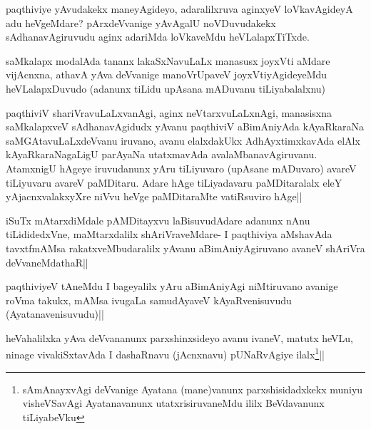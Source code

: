 \stext 


\begin{artha}
paqthiviye yAvudakekx maneyAgideyo, adaralilxruva aginxyeV loVkavAgideyA adu heVgeMdare? pArxdeVvanige yAvAgalU noVDuvudakekx sAdhanavAgiruvudu aginx adariMda loVkaveMdu heVLalapxTiTxde.
\end{artha}


\begin{artha}
saMkalapx modalAda tananx lakaSxNavuLaLx manasusx joyxVti aMdare vijAcnxna, athavA yAva deVvanige manoVrUpaveV joyxVtiyAgideyeMdu heVLalapxDuvudo (adanunx tiLidu upAsana mADuvanu tiLiyabalalxnu)
\end{artha}


\begin{artha}
paqthiviV shariVravuLaLxvanAgi, aginx neVtarxvuLaLxnAgi, manasisxna saMkalapxveV sAdhanavAgidudx yAvanu paqthiviV aBimAniyAda kAyaRkaraNa saMGAtavuLaLxdeVvanu iruvano, avanu elalxdakUkx AdhAyxtimxkavAda elAlx kAyaRkaraNagaLigU parAyaNa utatxmavAda avalaMbanavAgiruvanu. AtamxnigU hAgeye iruvudanunx yAru tiLiyuvaro (upAsane mADuvaro) avareV tiLiyuvaru avareV paMDitaru. Adare hAge tiLiyadavaru paMDitaralalx eleY yAjacnxvalakxyXre niVvu heVge paMDitaraMte vatiRsuviro hAge||
\end{artha}


\begin{artha}
iSuTx mAtarxdiMdale pAMDitayxvu laBisuvudAdare adanunx nAnu tiLididedxVne, maMtarxdalilx shAriVraveMdare- I paqthiviya aMshavAda tavxtfmAMsa rakatxveMbudaralilx yAvanu aBimAniyAgiruvano avaneV shAriVra deVvaneMdathaR||
\end{artha}


\begin{artha}
paqthiviyeV tAneMdu I bageyalilx yAru aBimAniyAgi niMtiruvano avanige roVma takukx, mAMsa ivugaLa samudAyaveV kAyaRvenisuvudu (Ayatanavenisuvudu)||
\end{artha}


\begin{artha}
heVahalilxka yAva deVvananunx parxshinxsideyo avanu ivaneV, matutx heVLu, ninage vivakiSxtavAda I dashaRnavu (jAcnxnavu) pUNaRvAgiye ilalx\footnote[1]{sAmAnayxvAgi deVvanige Ayatana (mane)vanunx parxshisidadxkekx muniyu visheVSavAgi Ayatanavanunx utatxrisiruvaneMdu ililx BeVdavanunx tiLiyabeVku}||
\end{artha}

